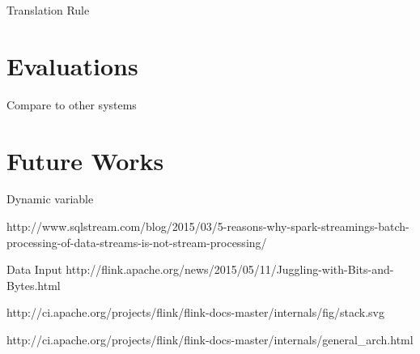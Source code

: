Translation Rule


\section{Evaluations}

Compare to other systems


\section{Future Works}

Dynamic variable


http://www.sqlstream.com/blog/2015/03/5-reasons-why-spark-streamings-batch-processing-of-data-streams-is-not-stream-processing/



Data Input
http://flink.apache.org/news/2015/05/11/Juggling-with-Bits-and-Bytes.html


http://ci.apache.org/projects/flink/flink-docs-master/internals/fig/stack.svg

http://ci.apache.org/projects/flink/flink-docs-master/internals/general\_arch.html